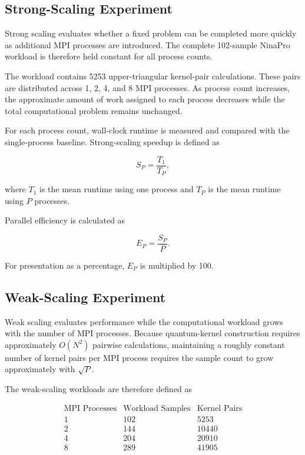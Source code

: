 \documentclass[pdflatex,sn-mathphys-num]{sn-jnl}%
\theoremstyle{thmstyleone}%
\theoremstyle{thmstyletwo}%
\theoremstyle{thmstylethree}%
\begin{document}
\subsection{Strong-Scaling Experiment}\label{subsec:strong-scaling}

Strong scaling evaluates whether a fixed problem can be completed more quickly
as additional MPI processes are introduced. The complete 102-sample NinaPro
workload is therefore held constant for all process counts.

The workload contains 5253 upper-triangular kernel-pair calculations. These
pairs are distributed across 1, 2, 4, and 8 MPI processes. As process count
increases, the approximate amount of work assigned to each process decreases
while the total computational problem remains unchanged.

For each process count, wall-clock runtime is measured and compared with the
single-process baseline. Strong-scaling speedup is defined as

\[
S_P = \frac{T_1}{T_P},
\]

where $T_1$ is the mean runtime using one process and $T_P$ is the mean runtime
using $P$ processes.

Parallel efficiency is calculated as

\[
E_P = \frac{S_P}{P}.
\]

For presentation as a percentage, $E_P$ is multiplied by 100.


\subsection{Weak-Scaling Experiment}\label{subsec:weak-scaling}

Weak scaling evaluates performance while the computational workload grows with
the number of MPI processes. Because quantum-kernel construction requires
approximately $O(N^2)$ pairwise calculations, maintaining a roughly constant
number of kernel pairs per MPI process requires the sample count to grow
approximately with $\sqrt{P}$.

The weak-scaling workloads are therefore defined as

\[
\begin{array}{c|c|c}
\text{MPI Processes} & \text{Workload Samples} & \text{Kernel Pairs} \\
\hline
1 & 102 & 5253 \\
2 & 144 & 10440 \\
4 & 204 & 20910 \\
8 & 289 & 41905
\end{array}
\]
\end{document}
